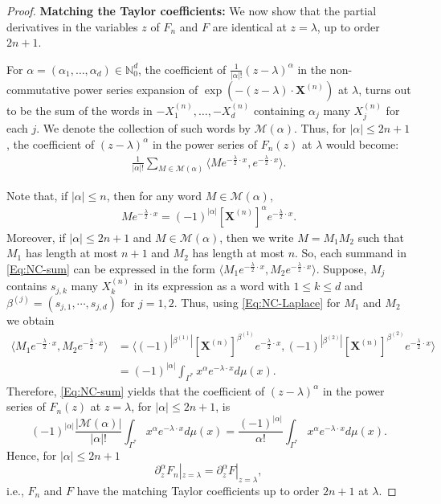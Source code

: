 \documentclass[10pt,a4paper]{amsart}
\begin{document}
\begin{proof}
\vspace{2mm}

  \noindent \textbf{Matching  the Taylor coefficients:} We now show that the partial derivatives in the variables $z$ of $F_n$ and $F$ are identical at $z = \lambda$, up to order $2n+1$.
    
For $\alpha=(\alpha_1, \dots, \alpha_d) \in \mathbb{N}_0^d$, the coefficient of $\frac{1}{|\alpha|!}(z-\lambda)^\alpha$ in the non-commutative power series expansion of $\exp (- (z- \lambda) \cdot \boldsymbol{X}^{(n)})$ at $\lambda$, turns out to be the sum of the words in $-X^{(n)}_1, \dots,-X^{(n)}_d$ containing $\alpha_j$ many $X^{(n)}_j$ for each $j$. We denote the collection of such words by $\mathcal{M}(\alpha)$.
Thus, for $|\alpha| \leq 2n+1$, the coefficient of $(z-\lambda)^\alpha$ in the power series of $F_n(z)$ at $\lambda$
would become:
\begin{align}\label{Eq:NC-sum}
\frac{1}{|\alpha|!} \sum_{M \in \mathcal{M}(\alpha)} \langle M e^{-\frac{\lambda}{2} \cdot x}, e^{-\frac{\lambda}{2} \cdot x} \rangle.
\end{align}

Note that, if $|\alpha| \leq n$, then for any word $M \in \mathcal{M}(\alpha)$,
\begin{align}\label{Eq:NC-Laplace}
M e^{-\frac{\lambda}{2} \cdot x} = (-1)^{|\alpha|} [\boldsymbol{X}^{(n)}]^\alpha e^{-\frac{\lambda}{2} \cdot x}.
\end{align}
Moreover, if $|\alpha|\leq 2n+1$ and $M\in \mathcal{M}(\alpha)$, then we write $M=M_1M_2$ such that $M_1$ has length at most $n+1$ and $M_2$ has length at most $n$. So, each summand in \eqref{Eq:NC-sum} can be expressed in the form $\langle M_1 e^{-\frac{\lambda}{2} \cdot x}, M_2 e^{-\frac{\lambda}{2} \cdot x}\rangle$. Suppose, $M_j$ contains $s_{j, k}$ many $X^{(n)}_k$ in its expression as a word with $1\leq k \leq d$ and $\beta^{(j)} = (s_{j, 1}, \cdots, s_{j, d} )$ for $j=1,2$. Thus, using \eqref{Eq:NC-Laplace} for $M_1$ and $M_2$ we obtain 
\begin{align*}
\langle M_1 e^{-\frac{\lambda}{2} \cdot x}, M_2 e^{-\frac{\lambda}{2} \cdot x}\rangle &= \langle (-1)^{|\beta^{(1)}|} [\boldsymbol{X}^{(n)}]^{\beta^{(1)}} e^{-\frac{\lambda}{2} \cdot x}, (-1)^{|\beta^{(2)}|} [\boldsymbol{X}^{(n)}]^{\beta^{(2)}} e^{-\frac{\lambda}{2} \cdot x}\rangle \\
& =(-1)^{|\alpha|} \int_{\Gamma^*} x^\alpha e^{-\lambda \cdot x} d\mu(x).
\end{align*}
Therefore, \eqref{Eq:NC-sum} yields that the coefficient of $(z-\lambda)^\alpha$ in the power series of $F_n(z)$ at $z=\lambda$, for $|\alpha| \leq 2n+1$, is
$$
(-1)^{|\alpha|} \frac{|\mathcal{M}(\alpha)|}{|\alpha|!}\int_{\Gamma^*} x^\alpha e^{-\lambda \cdot x} d\mu(x) =  \frac{(-1)^{|\alpha|}}{\alpha !} \int_{\Gamma^*} x^\alpha e^{-\lambda \cdot x} d\mu(x).
$$
Hence, for $|\alpha| \leq 2n+1$
$$
\partial^\alpha_ z F_n |_{z=\lambda} = \partial^\alpha_ z F |_{z=\lambda}, 
$$
i.e., $F_n$ and $F$ have the matching Taylor coefficients up to order $2n+1$ at $\lambda$. 


\end{proof}
\end{document}
